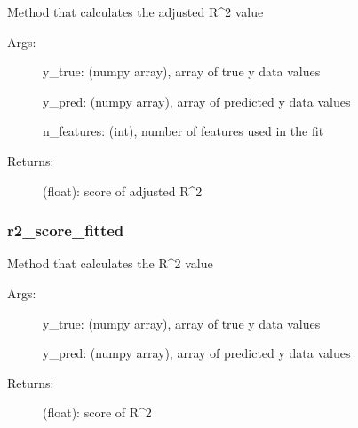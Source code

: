 \documentclass[letterpaper,10pt,english]{sphinxmanual}
\begin{document}
\begin{fulllineitems}
\label{\detokenize{api/mastml.metrics.r2_score_adjusted:mastml.metrics.r2_score_adjusted}}
Method that calculates the adjusted R\textasciicircum{}2 value
\begin{description}
\item[{Args:}] \leavevmode
y\_true: (numpy array), array of true y data values

y\_pred: (numpy array), array of predicted y data values

n\_features: (int), number of features used in the fit

\item[{Returns:}] \leavevmode
(float): score of adjusted R\textasciicircum{}2

\end{description}

\end{fulllineitems}



\subsubsection{r2\_score\_fitted}
\label{\detokenize{api/mastml.metrics.r2_score_fitted:r2-score-fitted}}\label{\detokenize{api/mastml.metrics.r2_score_fitted::doc}}

\begin{fulllineitems}
\label{\detokenize{api/mastml.metrics.r2_score_fitted:mastml.metrics.r2_score_fitted}}
Method that calculates the R\textasciicircum{}2 value
\begin{description}
\item[{Args:}] \leavevmode
y\_true: (numpy array), array of true y data values

y\_pred: (numpy array), array of predicted y data values

\item[{Returns:}] \leavevmode
(float): score of R\textasciicircum{}2

\end{description}

\end{fulllineitems}
\end{document}
